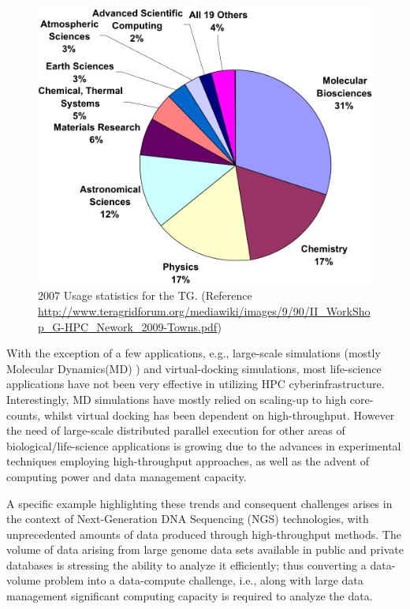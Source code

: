 \documentclass[]{article}
\begin{document}
\begin{figure}
 \centering
\includegraphics[scale=0.40]{figures/teragrid-discipline07}
\caption{\small 2007 Usage statistics for the TG.  (Reference
  \url{http://www.teragridforum.org/mediawiki/images/9/90/II_WorkShop_G-HPC_Nework_2009-Towns.pdf})}
  \label{tg2007}
\end{figure}

With the exception of a few applications, e.g., large-scale
simulations (mostly Molecular Dynamics(MD) ) and virtual-docking
simulations, most life-science applications have not been very
effective in utilizing HPC cyberinfrastructure.  Interestingly, MD
simulations have mostly relied on scaling-up to high core-counts,
whilst virtual docking has been dependent on high-throughput.  However
the need of large-scale distributed parallel execution for other
areas of biological/life-science applications is growing due to the
advances in experimental techniques employing high-throughput
approaches, as well as the advent of computing power and data
management capacity.  

A specific example highlighting these trends and consequent challenges
arises in the context of Next-Generation DNA Sequencing (NGS)
technologies, with unprecedented amounts of data produced through
high-throughput methods.  The volume of data arising from large genome
data sets available in public and private databases is stressing the
ability to analyze it efficiently; thus converting a data-volume
problem into a data-compute challenge, i.e., along with large data
management significant computing capacity is required to analyze the
data.
\end{document}
